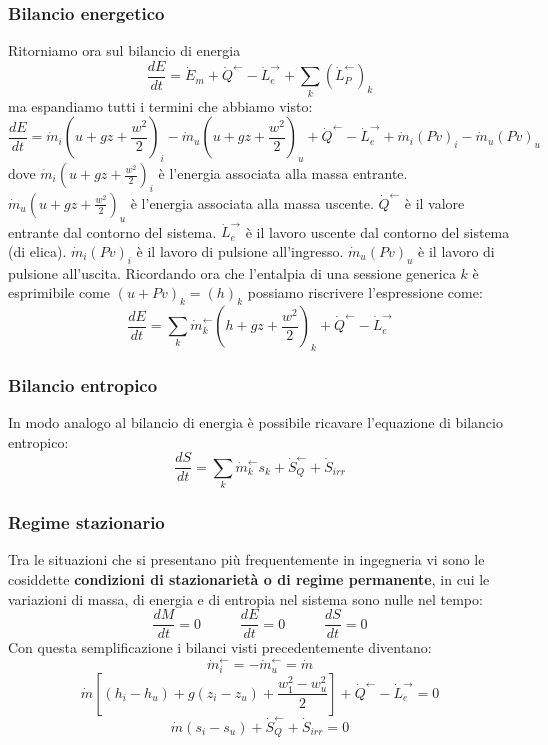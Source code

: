 \subsubsection{Bilancio energetico}
Ritorniamo ora sul bilancio di energia 
\[
    \frac{dE}{dt} = \dot{E}_m + \dot{Q}^\leftarrow - \dot{L}_e^\rightarrow + \sum_{k}(\dot{L}_P^\leftarrow)_k
\]
ma espandiamo tutti i termini che abbiamo visto:
\[
    \frac{dE}{dt} = \dot{m}_i \left( u + gz + \frac{w^2}{2} \right)_i - \dot{m}_u \left( u + gz + \frac{w^2}{2} \right)_u + \dot{Q}^\leftarrow - \dot{L}_e^\rightarrow  + \dot{m}_i(Pv)_i - \dot{m}_u(Pv)_u
\]
dove \newline
$\dot{m}_i \left( u + gz + \frac{w^2}{2} \right)_i$ è l'energia associata alla massa entrante.\newline
$\dot{m}_u \left( u + gz + \frac{w^2}{2} \right)_u$ è l'energia associata alla massa uscente. \newline
$\dot{Q}^\leftarrow$  è il valore entrante dal contorno del sistema.\newline
$\dot{L}_e^\rightarrow$ è il lavoro uscente dal contorno del sistema (di elica).\newline
$\dot{m}_i(Pv)_i$ è il lavoro di pulsione all'ingresso.\newline
$\dot{m}_u(Pv)_u$ è il lavoro di pulsione all'uscita.\newline
\newline
Ricordando ora che l'entalpia di una sessione generica $k$ è esprimibile come $(u +Pv)_k = (h)_k$ possiamo riscrivere l'espressione come:
\[
    \frac{dE}{dt} = \sum_{k}\dot{m}_k^\leftarrow  \left( h + gz + \frac{w^2}{2} \right)_k + \dot{Q}^\leftarrow  - \dot{L}_e^\rightarrow 
\]
\subsubsection{Bilancio entropico}
In modo analogo al bilancio di energia è possibile ricavare l'equazione di bilancio entropico:
\[
    \frac{dS}{dt} = \sum_{k} \dot{m}_k^\leftarrow s_k + \dot{S}_Q^\leftarrow  + \dot{S}_{irr}
\]
\subsubsection{Regime stazionario}
Tra le situazioni che si presentano più frequentemente in ingegneria vi sono le cosiddette \textbf{condizioni di stazionarietà o di regime permanente}, in cui le variazioni di massa, di energia e di entropia nel sistema sono nulle nel tempo:
\[
    \frac{dM}{dt} = 0 \;\;\;\;\;\;\;\;\;\;\frac{dE}{dt} = 0 \;\;\;\;\;\;\;\;\;\;\frac{dS}{dt} = 0
\]
Con questa semplificazione i bilanci visti precedentemente diventano:
\[
    \dot{m}_i^\leftarrow  = - \dot{m}_u^\leftarrow  = \dot{m}
\]
\[
    \dot{m}\left[(h_i-h_u) + g (z_i-z_u) + \frac{w_1^2 - w_u^2}{2}\right] + \dot{Q}^\leftarrow  - \dot{L}_e^\rightarrow  = 0
\]
\[
    \dot{m}(s_i - s_u) + \dot{S}_Q^\leftarrow  + \dot{S}_{irr} = 0
\]
